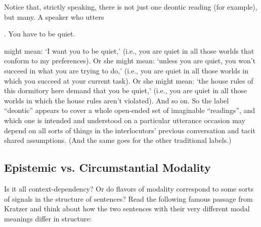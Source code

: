 Notice that, strictly speaking, there is not just one deontic reading
(for example), but many. A speaker who utters

\ex. You have to be quiet.

might mean: `I want you to be quiet,' (i.e., you are quiet in all
those worlds that conform to my preferences). Or she might mean:
`unless you are quiet, you won't succeed in what you are trying to
do,' (i.e., you are quiet in all those worlds in which you succeed at
your current task). Or she might mean: `the house rules of this
dormitory here demand that you be quiet,' (i.e., you are quiet in all
those worlds in which the house rules aren't violated). And so on. So
the label ``deontic'' appears to cover a whole open-ended set of
imaginable ``readings'', and which one is intended and understood on a
particular utterance occasion may depend on all sorts of things in the
interlocutors' previous conversation and tacit shared assumptions.
(And the same goes for the other traditional labels.)

\subsection{Epistemic vs. Circumstantial Modality}

Is it all context-dependency? Or do flavors of modality correspond to
some sorts of signals in the structure of sentences? Read the
following famous passage from Kratzer and think about how the two
sentences with their very different modal meanings differ in
structure:

